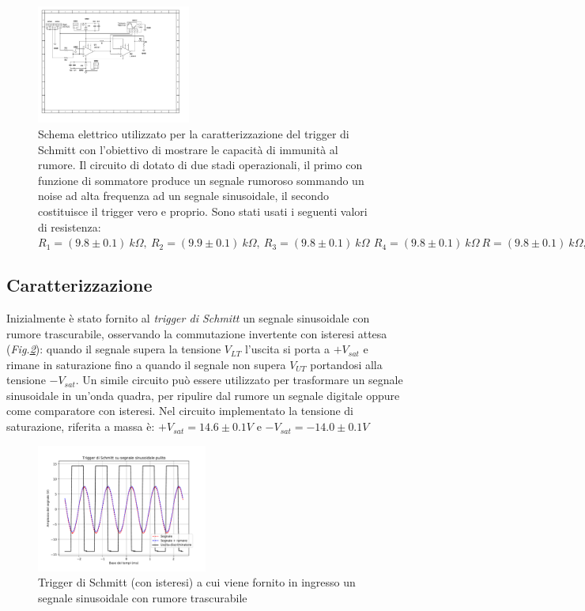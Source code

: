 \documentclass[journal]{IEEEtran}
\begin{document}
\begin{figure}[H]%
\begin{center}
\includegraphics[width=0.45\textwidth]{sch-simulations/output/OPA-mixer-trigger.pdf}
\caption{Schema elettrico utilizzato per la caratterizzazione del trigger di Schmitt con l'obiettivo di mostrare le capacità di immunità al rumore. Il circuito di dotato di due stadi operazionali, il primo con funzione di sommatore produce un segnale rumoroso sommando un noise ad alta frequenza ad un segnale sinusoidale, il secondo costituisce il trigger vero e proprio. Sono stati usati i seguenti valori di resistenza: $R_1 =(9.8 \pm 0.1) \ k\Omega, \ R_2 = (9.9 \pm 0.1) \ k\Omega ,\ R_3 = (9.8 \pm 0.1) \ k\Omega \, \ R_4 = (9.8 \pm 0.1) \ k\Omega \ R = (9.8 \pm 0.1) \ k\Omega , \ R = (9.8 \pm 0.1 ) \ k\Omega $  } 
\label{fig:schmitt-trigger}
\end{center}
\end{figure}
\subsection{\textbf{Caratterizzazione}}
Inizialmente è stato fornito al \textit{trigger di Schmitt} un segnale sinusoidale con rumore trascurabile, osservando la commutazione invertente con isteresi attesa (\textit{Fig.\ref{fig:trigger-clean}}): 
quando il segnale supera la tensione $V_{LT} $ l'uscita si porta a $ + V_{sat}$ e rimane in saturazione fino a quando il segnale non supera $V_{UT} $ portandosi alla tensione $- V_{sat}$. Un simile circuito può essere utilizzato per trasformare un segnale sinusoidale in un'onda quadra, per ripulire dal rumore un segnale digitale oppure come comparatore con isteresi.
Nel circuito implementato la tensione di saturazione, riferita a massa è: $+V_{sat}  = 14.6 \pm 0.1  V $ e $-V_{sat}  = -14.0 \pm 0.1  V $

\begin{figure}[H]%
\begin {center}
\includegraphics[width=0.50\textwidth]{analysis/output/trigger-pulito.pdf}
\caption{Trigger di Schmitt (con isteresi) a cui viene fornito in ingresso un segnale sinusoidale con rumore trascurabile}
\label{fig:trigger-clean}
\end {center}
\end{figure}
\end{document}
